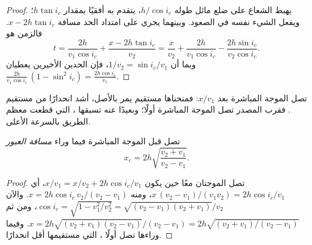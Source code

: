\begin{proof}
يهبط الشعاع على ضلع مائل طوله $h/\cos i_c$، يتقدم به
أفقيًا بمقدار $h\tan i_c$؛ ويفعل الشيء نفسه في الصعود. وبينهما
يجري على امتداد الحد مسافة $x - 2h\tan i_c$. فالزمن هو
\[
  t = \frac{2h}{v_1\cos i_c} + \frac{x - 2h\tan i_c}{v_2}
    = \frac{x}{v_2} + \frac{2h}{v_1\cos i_c} - \frac{2h\sin i_c}{v_2\cos i_c}.
\]
وبما أن $1/v_2 = \sin i_c/v_1$، فإن الحدين الأخيرين يعطيان
$\frac{2h}{v_1\cos i_c}\,(1 - \sin^2 i_c) = \frac{2h\cos i_c}{v_1}$.
\end{proof}

تصل الموجة المباشرة بعد $x/v_1$: فمنحناها مستقيم يمر
بالأصل، أشد انحدارًا من مستقيم . فقرب المصدر تصل الموجة المباشرة
أولًا؛ وبعيدًا عنه تسبقها ، التي قطعت معظم الطريق بالسرعة
الأعلى.

\begin{proposition}\label{prop:g11:seismic-structure:crossover}
تصل  قبل الموجة المباشرة فيما وراء \emph{مسافة
العبور}
\[
  x_c = 2h\sqrt{\frac{v_2 + v_1}{v_2 - v_1}}.
\]
\end{proposition}

\begin{proof}
تصل الموجتان معًا حين يكون $x/v_1 = x/v_2 + 2h\cos i_c/v_1$، أي
$x\,(v_2 - v_1)/(v_1 v_2) = 2h\cos i_c/v_1$، ومنه $x = 2h\cos i_c\,v_2/(v_2 -
v_1)$. والآن $\cos i_c = \sqrt{1 - v_1^2/v_2^2} = \sqrt{(v_2 - v_1)(v_2 +
v_1)}/v_2$، ومن ثم $x = 2h\sqrt{(v_2 + v_1)(v_2 - v_1)}/(v_2 - v_1) =
2h\sqrt{(v_2 + v_1)/(v_2 - v_1)}$. وفيما وراءها تصل أولًا ، التي
مستقيمها أقل انحدارًا.
\end{proof}

